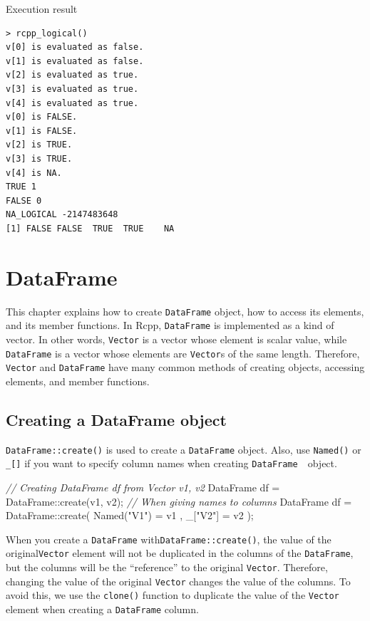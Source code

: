 \documentclass[]{book}
\newenvironment{Shaded}{\begin{snugshade}}{\end{snugshade}}
\newcommand{\StringTok}[1]{\textcolor[rgb]{0.31,0.60,0.02}{#1}}
\newcommand{\CommentTok}[1]{\textcolor[rgb]{0.56,0.35,0.01}{\textit{#1}}}
\newcommand{\NormalTok}[1]{#1}
\theoremstyle{definition}
\theoremstyle{definition}
\theoremstyle{remark}
\begin{document}
Execution result

\begin{verbatim}
> rcpp_logical()
v[0] is evaluated as false.
v[1] is evaluated as false.
v[2] is evaluated as true.
v[3] is evaluated as true.
v[4] is evaluated as true.
v[0] is FALSE.
v[1] is FALSE.
v[2] is TRUE.
v[3] is TRUE.
v[4] is NA.
TRUE 1
FALSE 0
NA_LOGICAL -2147483648
[1] FALSE FALSE  TRUE  TRUE    NA
\end{verbatim}

\chapter{DataFrame}\label{dataframe}

This chapter explains how to create \texttt{DataFrame} object, how to
access its elements, and its member functions. In Rcpp,
\texttt{DataFrame} is implemented as a kind of vector. In other words,
\texttt{Vector} is a vector whose element is scalar value, while
\texttt{DataFrame} is a vector whose elements are \texttt{Vector}s of
the same length. Therefore, \texttt{Vector} and \texttt{DataFrame} have
many common methods of creating objects, accessing elements, and member
functions.

\section{Creating a DataFrame object}\label{creating-a-dataframe-object}

\texttt{DataFrame::create()} is used to create a \texttt{DataFrame}
object. Also, use \texttt{Named()} or \texttt{\_{[}{]}} if you want to
specify column names when creating \texttt{DataFrame}　object.

\begin{Shaded}
\begin{Highlighting}[]
\CommentTok{// Creating DataFrame df from Vector v1, v2}
\NormalTok{DataFrame df = DataFrame::create(v1, v2);}
\CommentTok{// When giving names to columns}
\NormalTok{DataFrame df = DataFrame::create( Named(}\StringTok{"V1"}\NormalTok{) = v1 , _[}\StringTok{"V2"}\NormalTok{] = v2 );}
\end{Highlighting}
\end{Shaded}

When you create a \texttt{DataFrame} with\texttt{DataFrame::create()},
the value of the original\texttt{Vector} element will not be duplicated
in the columns of the \texttt{DataFrame}, but the columns will be the
``reference'' to the original \texttt{Vector}. Therefore, changing the
value of the original \texttt{Vector} changes the value of the columns.
To avoid this, we use the \texttt{clone()} function to duplicate the
value of the \texttt{Vector} element when creating a \texttt{DataFrame}
column.
\end{document}

